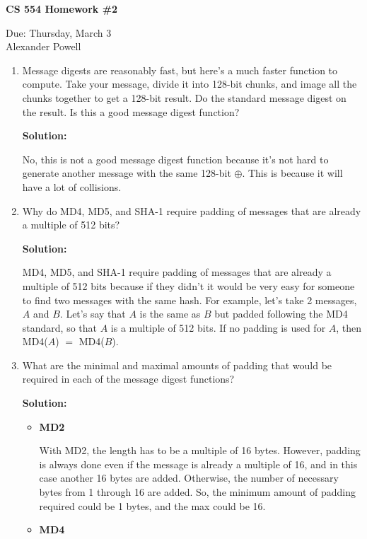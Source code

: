 \documentclass[11pt]{article}
\begin{document}
\begin{center}             %
\begin{LARGE}
{\bf CS 554 Homework \#2}
\end{LARGE}
\vskip 0.25cm      %

Due: Thursday, March 3\\  %
Alexander Powell
\end{center}

\begin{enumerate}
\item Message digests are reasonably fast, but here's a much faster function to compute. Take your message, divide it into 128-bit chunks, and image all the chunks together to get a 128-bit result. Do the standard message digest on the result. Is this a good message digest function?

\textbf{Solution: }

No, this is not a good message digest function because it's not hard to generate another message with the same 128-bit $\oplus$.  This is because it will have a lot of collisions.  

\item Why do MD4, MD5, and SHA-1 require padding of messages that are already a multiple of 512 bits?

\textbf{Solution: }

MD4, MD5, and SHA-1 require padding of messages that are already a multiple of 512 bits because if they didn't it would be very easy for someone to find two messages with the same hash.  For example, let's take 2 messages, $A$ and $B$.  Let's say that $A$ is the same as $B$ but padded following the MD4 standard, so that $A$ is a multiple of 512 bits.  If no padding is used for $A$, then MD4($A$) $=$ MD4($B$).   

\item What are the minimal and maximal amounts of padding that would be required in each of the message digest functions?

\textbf{Solution: }
\begin{itemize}
\item \textbf{MD2}

With MD2, the length has to be a multiple of 16 bytes.  However, padding is always done even if the message is already a multiple of 16, and in this case another 16 bytes are added.  Otherwise, the number of necessary bytes from 1 through 16 are added.  So, the minimum amount of padding required could be 1 bytes, and the max could be 16.  
\item \textbf{MD4}


\end{itemize}
\end{enumerate}
\end{document}
